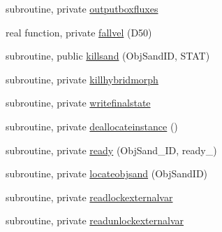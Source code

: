 \begin{DoxyCompactItemize}
subroutine, private \mbox{\hyperlink{namespacemodulesand_a587b88656b78d72a4c1f4bfedcf366c3}{outputboxfluxes}}
\item 
real function, private \mbox{\hyperlink{namespacemodulesand_a81b51403d378065ebb345027ab24a5af}{fallvel}} (D50)
\item 
subroutine, public \mbox{\hyperlink{namespacemodulesand_a29c3265b645ec50590d4d13545918a44}{killsand}} (Obj\+Sand\+ID, S\+T\+AT)
\item 
subroutine, private \mbox{\hyperlink{namespacemodulesand_a213ec97f902c200fd1bb472fe1490e92}{killhybridmorph}}
\item 
subroutine, private \mbox{\hyperlink{namespacemodulesand_afb972f404f3d402212f2af24b34ddb90}{writefinalstate}}
\item 
subroutine, private \mbox{\hyperlink{namespacemodulesand_afe6b0604957817eebf137ff6997e6351}{deallocateinstance}} ()
\item 
subroutine, private \mbox{\hyperlink{namespacemodulesand_a663024ee5ee19e5c00cce90c271934ea}{ready}} (Obj\+Sand\+\_\+\+ID, ready\+\_\+)
\item 
subroutine, private \mbox{\hyperlink{namespacemodulesand_a1cc021f53fc9b3dfb942f3a272588046}{locateobjsand}} (Obj\+Sand\+ID)
\item 
subroutine, private \mbox{\hyperlink{namespacemodulesand_a3bbda76d81b4711c3b088303a6953f52}{readlockexternalvar}}
\item 
subroutine, private \mbox{\hyperlink{namespacemodulesand_af758b46396eb7217217ae5f30679be76}{readunlockexternalvar}}
\end{DoxyCompactItemize}
